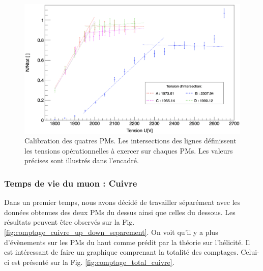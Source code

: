 \documentclass[12pt]{article}
\begin{document}
\begin{figure}[htpb!]
    \centering
    \includegraphics[width=\textwidth]{graphiques/experience1/calibration/calibration_exp1.png}
    \caption{Calibration des quatres PMs. Les intersections des lignes définissent les tensions opérationnelles à exercer sur chaques PMs. Les valeurs précises sont illustrés dans l'encadré.}
    \label{fig:Graph_calib_exp_1}
\end{figure}

\newpage
\subsubsection{Temps de vie du muon : Cuivre}

Dans un premier temps, nous avons décidé de travailler séparément avec les données obtenues des deux PMs du dessus ainsi que celles du dessous. Les résultats peuvent être observés sur la Fig. \ref{fig:comptage_cuivre_up_down_separement}. On voit qu'il y a plus d'évènements sur les PMs du haut comme prédit par la théorie sur l'hélicité. Il est intéressant de faire un graphique comprenant la totalité des comptages. Celui-ci est présenté sur la Fig. \ref{fig:comptage_total_cuivre}.
\end{document}
